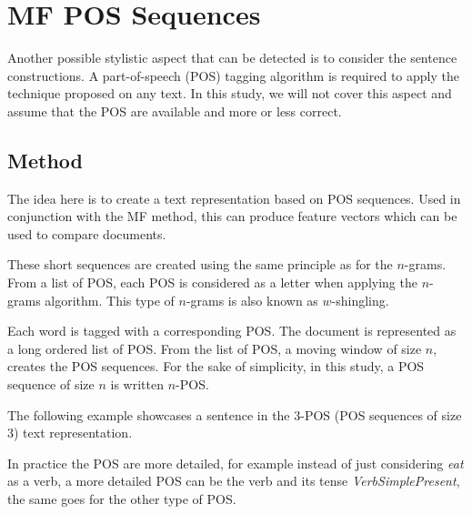 \section{MF POS Sequences \label{sec:pos_sequences}}

Another possible stylistic aspect that can be detected is to consider the sentence constructions.
A part-of-speech (POS) tagging algorithm is required to apply the technique proposed on any text.
In this study, we will not cover this aspect and assume that the POS are available and more or less correct.

\subsection{Method}

The idea here is to create a text representation based on POS sequences.
Used in conjunction with the MF method, this can produce feature vectors which can be used to compare documents.

These short sequences are created using the same principle as for the $n$-grams.
From a list of POS, each POS is considered as a letter when applying the $n$-grams algorithm.
This type of $n$-grams is also known as $w$-shingling.

\begin{definition}
  Each word is tagged with a corresponding POS.
  The document is represented as a long ordered list of POS.
  From the list of POS, a moving window of size $n$, creates the POS sequences.
  For the sake of simplicity, in this study, a POS sequence of size $n$ is written $n$-POS.
\end{definition}

The following example showcases a sentence in the 3-POS (POS sequences of size 3) text representation.


In practice the POS are more detailed, for example instead of just considering \textit{eat} as a verb, a more detailed POS can be the verb and its tense \textit{VerbSimplePresent}, the same goes for the other type of POS.

